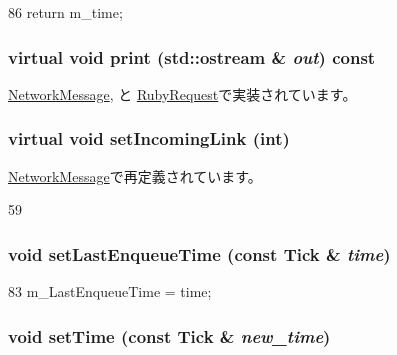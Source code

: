 \begin{DoxyCode}
86 { return m_time; }
\end{DoxyCode}
\hypertarget{classMessage_a3ea5f7af5db62cc24f4e40df9ea5c971}{
\subsubsection[{print}]{\setlength{\rightskip}{0pt plus 5cm}virtual void print (std::ostream \& {\em out}) const}}
\label{classMessage_a3ea5f7af5db62cc24f4e40df9ea5c971}


\hyperlink{classNetworkMessage_a3ea5f7af5db62cc24f4e40df9ea5c971}{NetworkMessage}, と \hyperlink{classRubyRequest_ac55fe386a101fbae38c716067c9966a0}{RubyRequest}で実装されています。\hypertarget{classMessage_a744ab1b6f6e038529292528e92ecf5dc}{
\subsubsection[{setIncomingLink}]{\setlength{\rightskip}{0pt plus 5cm}virtual void setIncomingLink (int)}}
\label{classMessage_a744ab1b6f6e038529292528e92ecf5dc}


\hyperlink{classNetworkMessage_a61dc2149684cb0f99ce3117c2c4c2e5a}{NetworkMessage}で再定義されています。


\begin{DoxyCode}
59 {}
\end{DoxyCode}
\hypertarget{classMessage_a39eba4c6107adb64574da829d35df8c7}{
\subsubsection[{setLastEnqueueTime}]{\setlength{\rightskip}{0pt plus 5cm}void setLastEnqueueTime (const {\bf Tick} \& {\em time})}}
\label{classMessage_a39eba4c6107adb64574da829d35df8c7}



\begin{DoxyCode}
83 { m_LastEnqueueTime = time; }
\end{DoxyCode}
\hypertarget{classMessage_ab260496efd18d4f23502f36a1a144feb}{
\subsubsection[{setTime}]{\setlength{\rightskip}{0pt plus 5cm}void setTime (const {\bf Tick} \& {\em new\_\-time})}}
\label{classMessage_ab260496efd18d4f23502f36a1a144feb}



